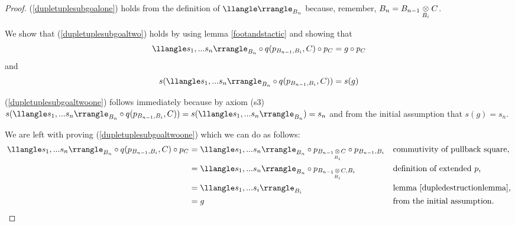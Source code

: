 \begin{proof}
(\ref{dupletuplesubgoalone}) holds from the definition of $\duple{}_{B_n}$ because, remember, $B_n=\crossx{B_{n-1}}{C}{B_i}$.

We show that (\ref{dupletuplesubgoaltwo}) holds by using lemma \ref{footandstactic} and showing that
\begin{equation}
\label{dupletuplesubgoaltwoone}
\duplesn \circ q(p_{B_{n-1},B_i},C) \circ p_C = g \circ p_C
\end{equation}
and
\begin{equation}
\label{dupletuplesubgoaltwoone}
s(\duplesn \circ q(p_{B_{n-1},B_i},C)) = s(g)
\end{equation}

(\ref{dupletuplesubgoaltwoone}) follows immediately because by axiom (s3) 
$s(\duplesn \circ q(p_{B_{n-1},B_i},C))=s(\duplesn)=s_n$ and from the initial assumption that
$s(g)=s_n$.

We are left with proving (\ref{dupletuplesubgoaltwoone}) which we can do as follows:
\begin{align*}
\duplesn \circ q(p_{B_{n-1},B_i},C) \circ p_C 
              &=  \duplesn \circ p_{\crossx{B_{n-1}}{C}{B_i}} \circ p_{B_{n-1},B_i} 
                                               && \mbox{commutivity of pullback square},               \\
							&=\duplesn \circ p_{\crossx{B_{n-1}}{C}{B_i},B_i} && \mbox{definition of extended $p$,}  \\
							&=\duplesi                                        && \mbox{lemma \ref{dupledestructionlemma},} \\
							&= g                                              && \mbox{from the initial assumption.}
\end{align*}
\end{proof}